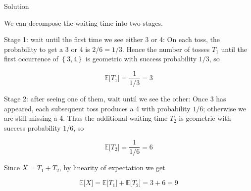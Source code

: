 \documentclass{qlnotes-export}
\begin{document}
\begin{qlsolution}{Solution}

We can decompose the waiting time into two stages.

Stage 1: wait until the first time we see either 3 or 4: On each toss, the probability to get a 3 or 4 is \(2/6 = 1/3\). Hence the number of tosses \(T_{1}\) until the first occurrence of \(\left\{ {3,4} \right\}\) is geometric with success probability \(1/3\), so

\[{\mathbb{E}}\lbrack T_{1}\rbrack = \frac{1}{1/3} = 3\]

Stage 2: after seeing one of them, wait until we see the other: Once 3 has appeared, each subsequent toss produces a 4 with probability \(1/6\); otherwise we are still missing a 4. Thus the additional waiting time \(T_{2}\) is geometric with success probability \(1/6\), so

\[{\mathbb{E}}\lbrack T_{2}\rbrack = \frac{1}{1/6} = 6\]

Since \(X = T_{1} + T_{2}\), by linearity of expectation we get

\[{\mathbb{E}}\lbrack X\rbrack = {\mathbb{E}}\lbrack T_{1}\rbrack + {\mathbb{E}}\lbrack T_{2}\rbrack = 3 + 6 = 9\]

\end{qlsolution}
\end{document}
